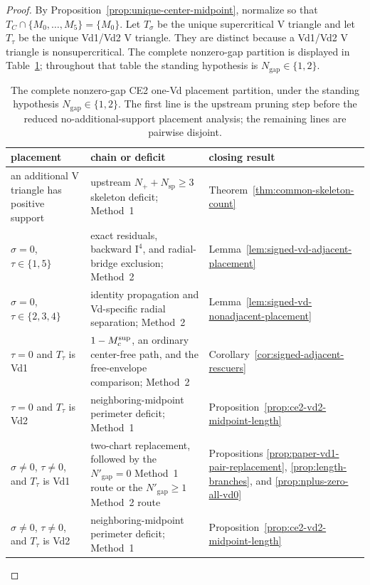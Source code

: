 \begin{proof}
By Proposition~\ref{prop:unique-center-midpoint}, normalize so that
$T_C\cap\{M_0,\ldots,M_5\}=\{M_0\}$.  Let $T_\sigma$ be the unique
supercritical V triangle and let $T_\tau$ be the unique Vd1/Vd2 V triangle.
They are distinct because a Vd1/Vd2 V triangle is nonsupercritical.  The
complete nonzero-gap partition is displayed in
Table~\ref{tab:ce2-one-vd-placement-cases}; throughout that table the standing
hypothesis is $N_{\mathrm{gap}}\in\{1,2\}$.

\begin{table}[H]
\centering
\scriptsize
\renewcommand{\arraystretch}{1.08}
\begin{tabular}{p{}p{}p{}}
\toprule
placement&chain or deficit&closing result\\
\midrule
an additional V triangle has positive support
 &upstream $N_++N_{\mathrm{sp}}\ge3$ skeleton deficit; Method~1
 &Theorem~\ref{thm:common-skeleton-count}\\
$\sigma=0$, $\tau\in\{1,5\}$
 &exact residuals, backward $\mathrm I^4$, and radial-bridge exclusion;
 Method~2
 &Lemma~\ref{lem:signed-vd-adjacent-placement}\\
$\sigma=0$, $\tau\in\{2,3,4\}$
 &identity propagation and Vd-specific radial separation; Method~2
 &Lemma~\ref{lem:signed-vd-nonadjacent-placement}\\
$\tau=0$ and $T_\tau$ is Vd1
 &$1-M_c^{\rm sup}$, an ordinary center-free path, and the free-envelope
 comparison; Method~2
 &Corollary~\ref{cor:signed-adjacent-rescuers}\\
$\tau=0$ and $T_\tau$ is Vd2
 &neighboring-midpoint perimeter deficit; Method~1
 &Proposition~\ref{prop:ce2-vd2-midpoint-length}\\
$\sigma\ne0$, $\tau\ne0$, and $T_\tau$ is Vd1
 &two-chart replacement, followed by the $N'_{\mathrm{gap}}=0$ Method~1
 route or the $N'_{\mathrm{gap}}\ge1$ Method~2 route
 &Propositions \ref{prop:paper-vd1-pair-replacement},
 \ref{prop:length-branches}, and \ref{prop:nplus-zero-all-vd0}\\
$\sigma\ne0$, $\tau\ne0$, and $T_\tau$ is Vd2
 &neighboring-midpoint perimeter deficit; Method~1
 &Proposition~\ref{prop:ce2-vd2-midpoint-length}\\
\bottomrule
\end{tabular}
\caption{The complete nonzero-gap CE2 one-Vd placement partition, under the
standing hypothesis $N_{\mathrm{gap}}\in\{1,2\}$.  The first line is the
upstream pruning step before the reduced no-additional-support placement
analysis; the remaining lines are pairwise disjoint.}
\label{tab:ce2-one-vd-placement-cases}
\end{table}


\end{proof}
